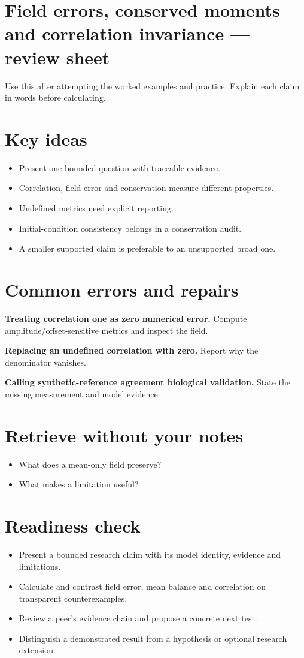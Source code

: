 \documentclass[11pt,letterpaper]{article}
\theoremstyle{definition}\newtheorem{definition}{Definition}\newtheorem{example}{Example}
\numberwithin{equation}{section}
\begin{document}
\section*{Field errors, conserved moments and correlation invariance --- review sheet}
Use this after attempting the worked examples and practice. Explain each claim in words before calculating.

\section*{Key ideas}
\begin{itemize}
\item Present one bounded question with traceable evidence.
\item Correlation, field error and conservation measure different properties.
\item Undefined metrics need explicit reporting.
\item Initial-condition consistency belongs in a conservation audit.
\item A smaller supported claim is preferable to an unsupported broad one.
\end{itemize}
\section*{Common errors and repairs}
\textbf{Treating correlation one as zero numerical error.} Compute amplitude/offset-sensitive metrics and inspect the field.

\textbf{Replacing an undefined correlation with zero.} Report why the denominator vanishes.

\textbf{Calling synthetic-reference agreement biological validation.} State the missing measurement and model evidence.

\section*{Retrieve without your notes}
\begin{itemize}
\item What does a mean-only field preserve?
\item What makes a limitation useful?
\end{itemize}
\section*{Readiness check}
\begin{itemize}
\item Present a bounded research claim with its model identity, evidence and limitations.
\item Calculate and contrast field error, mean balance and correlation on transparent counterexamples.
\item Review a peer's evidence chain and propose a concrete next test.
\item Distinguish a demonstrated result from a hypothesis or optional research extension.
\end{itemize}
\end{document}
